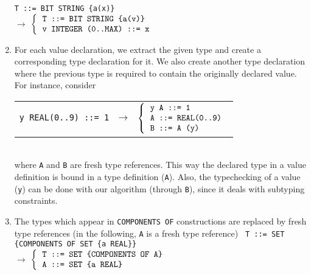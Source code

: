 \begin{enumerate}
{          \verb+T ::= BIT STRING {a(x)}+\\
           $\longrightarrow$
           $\left\{
                \begin{tabular}{l} 
                   \verb+T ::= BIT STRING {a(v)}+\\
                   \verb+v INTEGER (0..MAX) ::= x+
                \end{tabular}
              \right.$
        }

  \item \label{types_from_values}
        For each value declaration, we extract the given type and
        create a corresponding type declaration for it. We also create
        another type declaration where the previous type is required 
        to contain the originally declared value. For instance,
        consider\\
        {\small
         \begin{tabular}{l}
           \verb+y REAL(0..9) ::= 1+
           $\,\, \longrightarrow \,\,$
           \hspace*{-3.9pt}
           $\left\{
                \begin{tabular}{l} 
                   \verb+y A ::= 1+\\
                   \verb+A ::= REAL(0..9)+\\
                   \verb+B ::= A (y)+
                \end{tabular}
              \right.$
         \end{tabular}
        }\\
        where \verb+A+ and \verb+B+ are fresh type references. This
        way the declared type in a value definition is bound in a
        type definition (\texttt{\small A}). Also, the
        typechecking of a value (\texttt{y}) can be done with our
        algorithm (through \texttt{\small B}), since it deals with
        subtyping constraints.

  \item \label{COMPONENTS_OF_reference}
        The types which appear in
        \texttt{\small COM\-PO\-NENTS OF} constructions are
        replaced by fresh type references (in the following,
        \texttt{A} is a fresh type reference)
        {\small
         \verb+ T ::= SET {COMPONENTS OF SET {a REAL}}+\\
         $\longrightarrow$
         $\left\{
            \begin{tabular}{l}
               \verb+T ::= SET {COMPONENTS OF A}+\\
               \verb+A ::= SET {a REAL}+
            \end{tabular}
          \right.$}


\end{enumerate}

